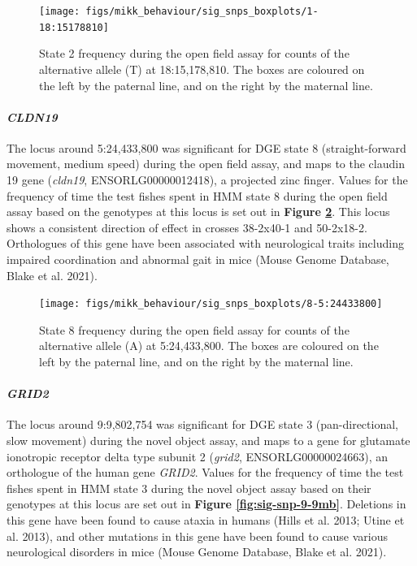 \documentclass[
]{book}
\begin{document}
\begin{figure}
\texttt{[image: figs/mikk\_behaviour/sig\_snps\_boxplots/1-18:15178810]} \caption{State 2 frequency during the open field assay for counts of the alternative allele (T) at 18:15,178,810. The boxes are coloured on the left by the paternal line, and on the right by the maternal line.}\label{fig:sig-snp-18-15mb}
\end{figure}

\hypertarget{cldn19}{%
\paragraph{\texorpdfstring{\emph{CLDN19}}{CLDN19}}\label{cldn19}}

The locus around 5:24,433,800 was significant for DGE state 8 (straight-forward movement, medium speed) during the open field assay, and maps to the claudin 19 gene (\emph{cldn19}, ENSORLG00000012418), a projected zinc finger. Values for the frequency of time the test fishes spent in HMM state 8 during the open field assay based on the genotypes at this locus is set out in \textbf{Figure \ref{fig:sig-snp-5-24mb}}. This locus shows a consistent direction of effect in crosses 38-2x40-1 and 50-2x18-2. Orthologues of this gene have been associated with neurological traits including impaired coordination and abnormal gait in mice (Mouse Genome Database, Blake et al. 2021).



\begin{figure}

{\centering \texttt{[image: figs/mikk\_behaviour/sig\_snps\_boxplots/8-5:24433800]} 

}

\caption{State 8 frequency during the open field assay for counts of the alternative allele (A) at 5:24,433,800. The boxes are coloured on the left by the paternal line, and on the right by the maternal line.}\label{fig:sig-snp-5-24mb}
\end{figure}

\hypertarget{grid2}{%
\paragraph{\texorpdfstring{\emph{GRID2}}{GRID2}}\label{grid2}}

The locus around 9:9,802,754 was significant for DGE state 3 (pan-directional, slow movement) during the novel object assay, and maps to a gene for glutamate ionotropic receptor delta type subunit 2 (\emph{grid2}, ENSORLG00000024663), an orthologue of the human gene \emph{GRID2}. Values for the frequency of time the test fishes spent in HMM state 3 during the novel object assay based on their genotypes at this locus are set out in \textbf{Figure \ref{fig:sig-snp-9-9mb}}. Deletions in this gene have been found to cause ataxia in humans (Hills et al. 2013; Utine et al. 2013), and other mutations in this gene have been found to cause various neurological disorders in mice (Mouse Genome Database, Blake et al. 2021).
\end{document}
